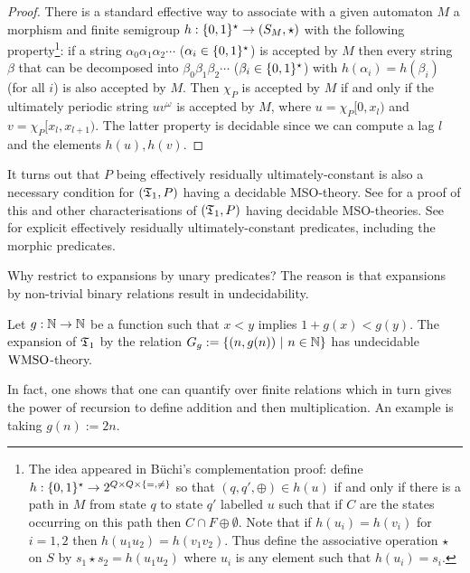 \begin{proof}
There is a standard effective way to associate with a given automaton $M$ a morphism and finite semigroup $h:\{0,1\}^\star \to (S_M,\star)$ with the following property\footnote{The idea appeared in B\"uchi's complementation proof: define $h:\{0,1\}^\star \to 2^{Q \times Q \times \{=,\neq\}}$ so that $(q,q',\oplus) \in h(u)$ if
and only if there is a path in $M$ from state $q$ to state $q'$ labelled $u$ such that if $C$ are the states occurring on this path then $C \cap F \oplus \emptyset $. Note that if $h(u_i) = h(v_i)$ for $i = 1,2$ then $h(u_1u_2) = h(v_1v_2)$. Thus define the associative operation $\star$ on $S$ by
$s_1 \star  s_2 = h(u_1u_2)$ where $u_i$ is any element such that $h(u_i) = s_i$.
}: if a string $\alpha_0\alpha_1\alpha_2\cdots$ ($\alpha_i \in \{0,1\}^\star$) is accepted by $M$
then every string $\beta$ that can be decomposed into $\beta_0\beta_1\beta_2\cdots$ ($\beta_i \in \{0,1\}^\star$) with $h(\alpha_i)=h(\beta_i)$ (for all $i$) is also accepted by $M$.
Then $\chi_P$ is accepted by $M$ if and only if
the ultimately periodic string $uv^\omega$ is accepted by $M$, where $u = \chi_P[0,x_l)$ and $v = \chi_P[x_l,x_{l+1})$. The latter property is decidable since we can compute a lag $l$ and the elements $h(u),h(v)$.
\end{proof}

It turns out that $P$ being effectively residually ultimately-constant is also a necessary condition for $(\mathfrak{T}_1,P)$ having a decidable MSO-theory. See \cite{RaTh06, rabinovich07} for a proof of this and other characterisations of $(\mathfrak{T}_1,P)$ having decidable MSO-theories. See \cite{CaTh02,Bara07} for explicit effectively residually ultimately-constant predicates, including the morphic predicates.
  
Why restrict to expansions by unary predicates? The reason is that expansions by non-trivial binary relations result in undecidability. 

\begin{theorem} \cite{ElRa66}
Let $g:\mathbb{N} \to \mathbb{N}$ be a function such that $x < y$ implies $1 + g(x) < g(y)$.
The expansion of $\mathfrak{T}_1$ by the relation $G_g:= \{(n,g(n)) \ \vert \  n \in \mathbb{N}\}$ has undecidable $\mbox{\rm WMSO}$-theory.
\end{theorem}

In fact, one shows that one can quantify over finite relations which in turn gives the power of recursion to define addition and then multiplication.
An example is taking $g(n) := 2n$.

